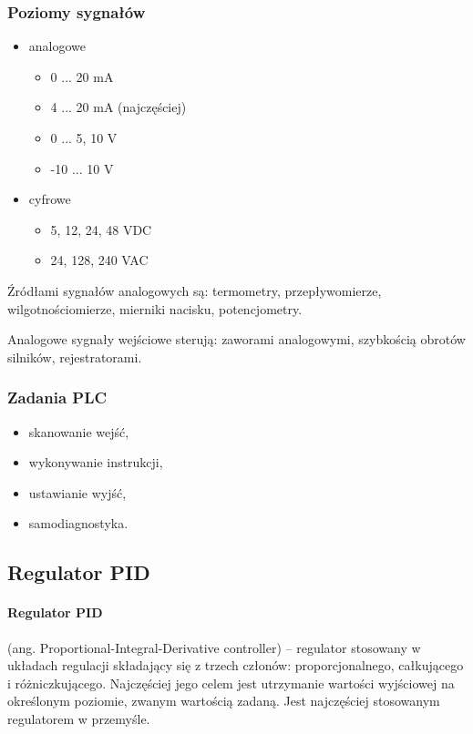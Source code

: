 \documentclass[a4paper,twoside]{report}
\begin{document}
\subsubsection{Poziomy sygnałów}
\begin{itemize}
\item analogowe
	\begin{itemize}
	\item 0 ... 20 mA
	\item 4 ... 20 mA (najczęściej)
	\item 0 ... 5, 10 V
	\item -10 ... 10 V
	\end{itemize}
\item cyfrowe
	\begin{itemize}
	\item 5, 12, 24, 48 VDC
	\item 24, 128, 240 VAC
	\end{itemize}
\end{itemize}
Źródłami sygnałów analogowych są: termometry, przepływomierze, wilgotnościomierze, mierniki nacisku, potencjometry.

Analogowe sygnały wejściowe sterują: zaworami analogowymi, szybkością obrotów silników, rejestratorami.

\subsubsection{Zadania PLC}
\begin{itemize}
\item skanowanie wejść,
\item wykonywanie instrukcji,
\item ustawianie wyjść,
\item samodiagnostyka.
\end{itemize}

\subsection{Regulator PID}

\paragraph{Regulator PID} (ang. Proportional-Integral-Derivative controller) – regulator stosowany w układach regulacji składający się z trzech członów: proporcjonalnego, całkującego i różniczkującego. Najczęściej jego celem jest utrzymanie wartości wyjściowej na określonym poziomie, zwanym wartością zadaną. Jest najczęściej stosowanym regulatorem w przemyśle.\\
\end{document}
